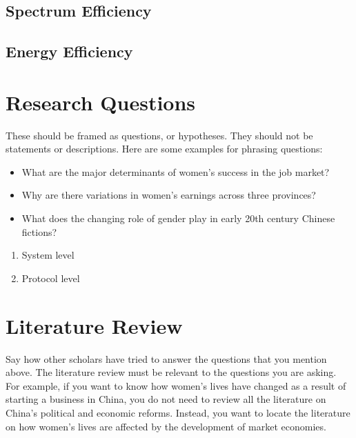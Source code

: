 \documentclass[journal,onecolumn,12pt]{IEEEtran}
\begin{document}
\subsection{Spectrum Efficiency}

\subsection{Energy Efficiency}

\section{Research Questions}
These should be framed as questions, or hypotheses. They should not be statements or descriptions. Here are some examples for phrasing questions:
\begin{itemize}
  \item What are the major determinants of women's success in the job market?
  \item Why are there variations in women's earnings across three provinces?
  \item What does the changing role of gender play in early 20th century Chinese fictions?
\end{itemize}

\begin{enumerate}
  \item System level
  \item Protocol level
\end{enumerate}

\section{Literature Review}
Say how other scholars have tried to answer the questions that you mention above. The literature review must be
relevant to the questions you are asking. For example, if you want to know how women's lives have changed as
a result of starting a business in China, you do not need to review all the literature on China's political and
economic reforms. Instead, you want to locate the literature on how women's lives are affected by the
development of market economies.
\end{document}
